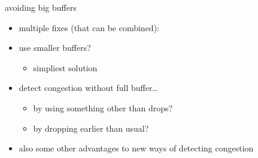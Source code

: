 \begin{frame}{avoiding big buffers}
    \begin{itemize}
    \item multiple fixes (that can be combined):
    \vspace{.5cm}
    \item use smaller buffers?
        \begin{itemize}
        \item simpliest solution
        \end{itemize}
    \item detect congestion without full buffer\ldots
        \begin{itemize}
        \item by using something other than drops?
        \item by dropping earlier than usual?
        \end{itemize}
    \vspace{.5cm}
    \item<2-> also some other advantages to new ways of detecting congestion
    \end{itemize}
\end{frame}
